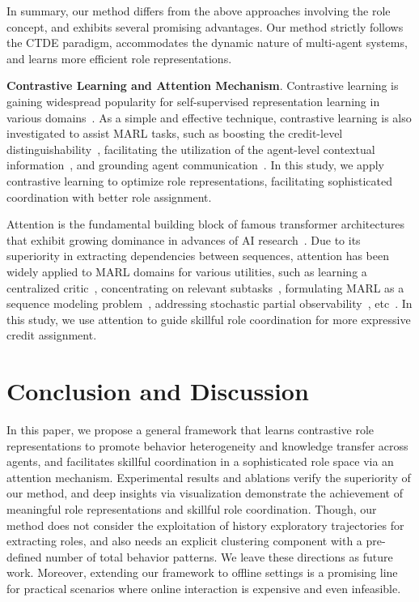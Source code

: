 \documentclass{article} %
\begin{document}
In summary, our method differs from the above approaches involving the role concept, and exhibits several promising advantages.
Our method strictly follows the CTDE paradigm, accommodates the dynamic nature of multi-agent systems, and learns more efficient role representations.


\textbf{Contrastive Learning and Attention Mechanism}.
Contrastive learning is gaining widespread popularity for self-supervised representation learning in various domains~\citep{he2020momentum,su2022contrastive,laskin2020curl}.
As a simple and effective technique, contrastive learning is also investigated to assist MARL tasks, such as boosting the credit-level distinguishability~\citep{liu2023contrastive}, facilitating the utilization of the agent-level contextual information~\citep{song2023ma2clmasked}, and grounding agent communication~\citep{lo2022learning}.
In this study, we apply contrastive learning to optimize role representations, facilitating sophisticated coordination with better role assignment.

Attention is the fundamental building block of famous transformer architectures~\citep{vaswani2017attention} that exhibit growing dominance in advances of AI research~\citep{brown2020language,dosovitskiy2021image,chen2021decision}.
Due to its superiority in extracting dependencies between sequences, attention has been widely applied to MARL domains for various utilities, such as learning a centralized critic~\citep{iqbal2019actor}, concentrating on relevant subtasks~\citep{yuan2022multi}, formulating MARL as a sequence modeling problem~\citep{wen2022multi}, addressing stochastic partial observability~\citep{phan2023attention}, etc~\citep{yang2020qatten,shao2023complementary,zhai2023dynamic}.
In this study, we use attention to guide skillful role coordination for more expressive credit assignment.



\section{Conclusion and Discussion}
In this paper, we propose a general framework that learns contrastive role representations to promote behavior heterogeneity and knowledge transfer across agents, and facilitates skillful coordination in a sophisticated role space via an attention mechanism.
Experimental results and ablations verify the superiority of our method, and deep insights via visualization demonstrate the achievement of meaningful role representations and skillful role coordination.
Though, our method does not consider the exploitation of history exploratory trajectories for extracting roles, and also needs an explicit clustering component with a pre-defined number of total behavior patterns. 
We leave these directions as future work.
Moreover, extending our framework to offline settings is a promising line for practical scenarios where online interaction is expensive and even infeasible.
\end{document}
